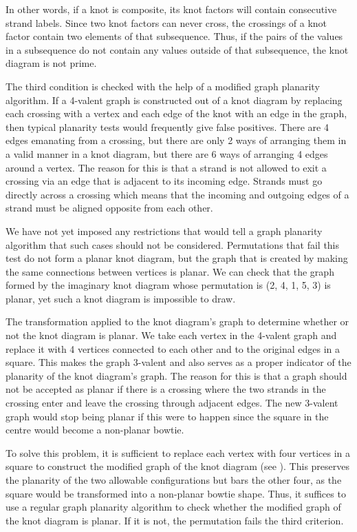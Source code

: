 \begin{paper}
In other words, if a knot is composite, its knot factors will contain
consecutive strand labels.
Since two knot factors can never cross, the crossings of a knot factor contain
two elements of that subsequence.
Thus, if the pairs of the values in a subsequence do not contain any values
outside of that subsequence, the knot diagram is not prime.

The third condition is checked with the help of a modified graph planarity
algorithm.
If a 4-valent graph is constructed out of a knot diagram by replacing each
crossing with a vertex and each edge of the knot with an edge in the graph, then
typical planarity tests would frequently give false positives.
There are 4 edges emanating from a crossing, but there are only 2 ways of
arranging them in a valid manner in a knot diagram, but there are 6 ways of
arranging 4 edges around a vertex.
The reason for this is that a strand is not allowed to exit a crossing via an
edge that is adjacent to its incoming edge.
Strands must go directly across a crossing which means that the incoming and
outgoing edges of a strand must be aligned opposite from each other.

We have not yet imposed any restrictions that would tell a graph planarity
algorithm that such cases should not be considered.
Permutations that fail this test do not form a planar knot diagram, but the
graph that is created by making the same connections between vertices is
planar.
We can check that the graph formed by the imaginary knot diagram whose
permutation is (2, 4, 1, 5, 3) is planar, yet such a knot diagram is impossible
to draw.

{The transformation applied to the knot diagram's graph to determine whether or
not the knot diagram is planar.
We take each vertex in the 4-valent graph and replace it with 4 vertices
connected to each other and to the original edges in a square.
This makes the graph 3-valent and also serves as a proper indicator of the
planarity of the knot diagram's graph.
The reason for this is that a graph should not be accepted as planar if there is
a crossing where the two strands in the crossing enter and leave the crossing
through adjacent edges.
The new 3-valent graph would stop being planar if this were to happen since the
square in the centre would become a non-planar bowtie.}

To solve this problem, it is sufficient to replace each vertex with four
vertices in a square to construct the modified graph of the knot diagram (see
\figGraph).
This preserves the planarity of the two allowable configurations but bars the
other four, as the square would be transformed into a non-planar bowtie shape.
Thus, it suffices to use a regular graph planarity algorithm to check whether
the modified graph of the knot diagram is planar.
If it is not, the permutation fails the third criterion.


\end{paper}
